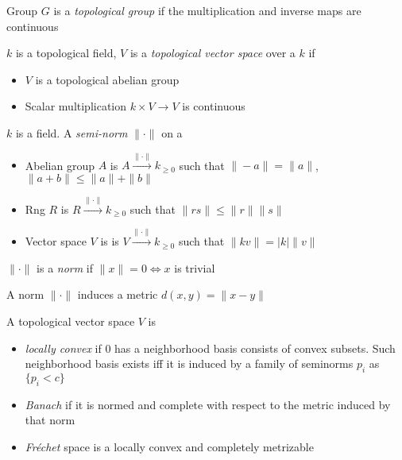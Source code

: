\documentclass[main]{subfiles}
\begin{document}
\begin{definition}
Group $G$ is a \textit{topological group} if the multiplication and inverse maps are continuous
\end{definition}

\begin{definition}
$k$ is a topological field, $V$ is a \textit{topological vector space} over a $k$ if
\begin{itemize}
\item $V$ is a topological abelian group
\item Scalar multiplication $k\times V\to V$ is continuous
\end{itemize}
\end{definition}

\begin{definition}
$k$ is a field. A \textit{semi-norm} $\|\cdot\|$ on a
\begin{itemize}
\item Abelian group $A$ is $A\xrightarrow{\|\cdot\|}k_{\geq0}$ such that $\|-a\|=\|a\|$, $\|a+b\|\leq\|a\|+\|b\|$
\item Rng $R$ is $R\xrightarrow{\|\cdot\|}k_{\geq0}$ such that $\|rs\|\leq\|r\|\|s\|$ \par
\item Vector space $V$ is is $V\xrightarrow{\|\cdot\|}k_{\geq0}$ such that $\|kv\|=|k|\|v\|$
\end{itemize}
$\|\cdot\|$ is a \textit{norm} if $\|x\|=0\iff x$ is trivial
\end{definition}

\begin{remark}
A norm $\|\cdot\|$ induces a metric $d(x,y)=\|x-y\|$
\end{remark}

\begin{definition}
A topological vector space $V$ is
\begin{itemize}
\item \textit{locally convex} if 0 has a neighborhood basis consists of convex subsets. Such neighborhood basis exists iff it is induced by a family of seminorms $p_i$ as $\{p_i<c\}$
\item \textit{Banach} if it is normed and complete with respect to the metric induced by that norm
\item \textit{Fr\'echet} space is a locally convex and completely metrizable
\end{itemize}
\end{definition}
\end{document}

